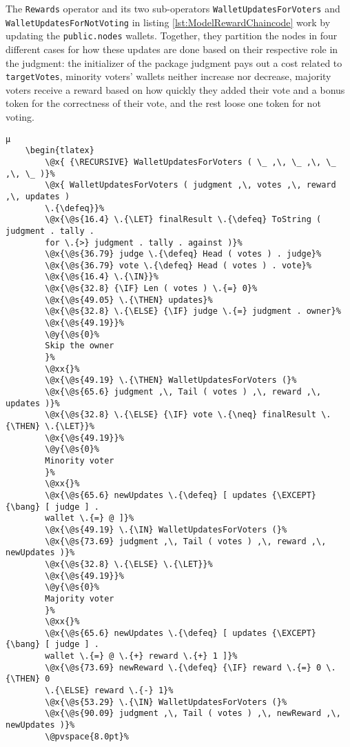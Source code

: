 The \texttt{Rewards} operator and its two sub-operators \texttt{WalletUpdatesForVoters} and \texttt{WalletUpdatesForNotVoting} in listing \ref{lst:ModelRewardChaincode} work by updating the \texttt{public.nodes} wallets. Together, they partition the nodes in four different cases for how these updates are done based on their respective role in the judgment: the initializer of the package judgment pays out a cost related to \texttt{targetVotes}, minority voters' wallets neither increase nor decrease, majority voters receive a reward based on how quickly they added their vote and a bonus token for the correctness of their vote, and the rest loose one token for not voting.

\begin{lstlisting}[caption=Operator updating wallets for judgment, label=lst:ModelRewardChaincode]
	µ
	\begin{tlatex}
        \@x{ {\RECURSIVE} WalletUpdatesForVoters ( \_ ,\, \_ ,\, \_ ,\, \_ )}%
        \@x{ WalletUpdatesForVoters ( judgment ,\, votes ,\, reward ,\, updates )
        \.{\defeq}}%
        \@x{\@s{16.4} \.{\LET} finalResult \.{\defeq} ToString ( judgment . tally .
        for \.{>} judgment . tally . against )}%
        \@x{\@s{36.79} judge \.{\defeq} Head ( votes ) . judge}%
        \@x{\@s{36.79} vote \.{\defeq} Head ( votes ) . vote}%
        \@x{\@s{16.4} \.{\IN}}%
        \@x{\@s{32.8} {\IF} Len ( votes ) \.{=} 0}%
        \@x{\@s{49.05} \.{\THEN} updates}%
        \@x{\@s{32.8} \.{\ELSE} {\IF} judge \.{=} judgment . owner}%
        \@x{\@s{49.19}}%
        \@y{\@s{0}%
        Skip the owner
        }%
        \@xx{}%
        \@x{\@s{49.19} \.{\THEN} WalletUpdatesForVoters (}%
        \@x{\@s{65.6} judgment ,\, Tail ( votes ) ,\, reward ,\, updates )}%
        \@x{\@s{32.8} \.{\ELSE} {\IF} vote \.{\neq} finalResult \.{\THEN} \.{\LET}}%
        \@x{\@s{49.19}}%
        \@y{\@s{0}%
        Minority voter
        }%
        \@xx{}%
        \@x{\@s{65.6} newUpdates \.{\defeq} [ updates {\EXCEPT} {\bang} [ judge ] .
        wallet \.{=} @ ]}%
        \@x{\@s{49.19} \.{\IN} WalletUpdatesForVoters (}%
        \@x{\@s{73.69} judgment ,\, Tail ( votes ) ,\, reward ,\, newUpdates )}%
        \@x{\@s{32.8} \.{\ELSE} \.{\LET}}%
        \@x{\@s{49.19}}%
        \@y{\@s{0}%
        Majority voter
        }%
        \@xx{}%
        \@x{\@s{65.6} newUpdates \.{\defeq} [ updates {\EXCEPT} {\bang} [ judge ] .
        wallet \.{=} @ \.{+} reward \.{+} 1 ]}%
        \@x{\@s{73.69} newReward \.{\defeq} {\IF} reward \.{=} 0 \.{\THEN} 0
        \.{\ELSE} reward \.{-} 1}%
        \@x{\@s{53.29} \.{\IN} WalletUpdatesForVoters (}%
        \@x{\@s{90.09} judgment ,\, Tail ( votes ) ,\, newReward ,\, newUpdates )}%
        \@pvspace{8.0pt}%


\end{lstlisting}
